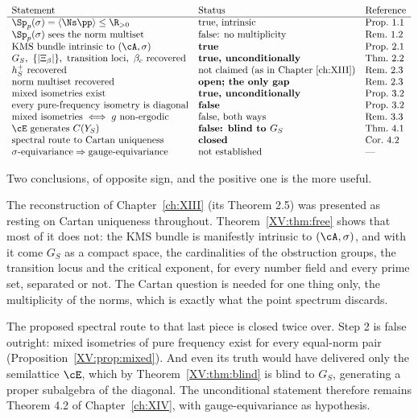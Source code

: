 \[
\begin{array}{lll}
\text{Statement} & \text{Status} & \text{Reference}\\\hline
\Sp_p(\sigma)=\langle\Ns\pp\rangle\le\R_{>0} & \text{true, intrinsic} & \text{Prop.~1.1}\\
\Sp_p(\sigma)\ \text{sees the norm multiset} & \text{false: no multiplicity} & \text{Rem.~1.2}\\
\text{KMS bundle intrinsic to }(\cA,\sigma) & \textbf{true} & \text{Prop.~2.1}\\
G_S,\ \{|\Xi_\beta|\},\ \text{transition loci},\ \beta_c\ \text{recovered} & \textbf{true, unconditionally} & \text{Thm.~2.2}\\
h^+_S\ \text{recovered} & \text{not claimed (as in Chapter~\ref{ch:XIII})} & \text{Rem.~2.3}\\
\text{norm multiset recovered} & \textbf{open; the only gap} & \text{Rem.~2.3}\\
\text{mixed isometries exist} & \textbf{true, unconditionally} & \text{Prop.~3.2}\\
\text{every pure-frequency isometry is diagonal} & \textbf{false} & \text{Prop.~3.2}\\
\text{mixed isometries}\iff g\ \text{non-ergodic} & \text{false, both ways} & \text{Rem.~3.3}\\
\cE\ \text{generates}\ C(Y_S) & \textbf{false: blind to }G_S & \text{Thm.~4.1}\\
\text{spectral route to Cartan uniqueness} & \textbf{closed} & \text{Cor.~4.2}\\
\sigma\text{-equivariance}\Rightarrow\text{gauge-equivariance} & \text{not established} & \text{---}
\end{array}
\]

Two conclusions, of opposite sign, and the positive one is the more useful.

The reconstruction of Chapter~\ref{ch:XIII} (its Theorem 2.5) was presented as resting on Cartan
uniqueness throughout. Theorem~\ref{XV:thm:free} shows that most of it does not: the
$\mathrm{KMS}$ bundle is manifestly intrinsic to $(\cA,\sigma)$, and with it come $G_S$ as a
compact space, the cardinalities of the obstruction groups, the transition locus and the
critical exponent, for every number field and every prime set, separated or not. The Cartan
question is needed for one thing only, the multiplicity of the norms, which is exactly what
the point spectrum discards.

The proposed spectral route to that last piece is closed twice over. Step 2 is false
outright: mixed isometries of pure frequency exist for every equal-norm pair
(Proposition~\ref{XV:prop:mixed}). And even its truth would have delivered only the semilattice
$\cE$, which by Theorem~\ref{XV:thm:blind} is blind to $G_S$, generating a proper subalgebra of
the diagonal. The unconditional statement therefore remains Theorem 4.2 of Chapter~\ref{ch:XIV}, with
gauge-equivariance as hypothesis.

